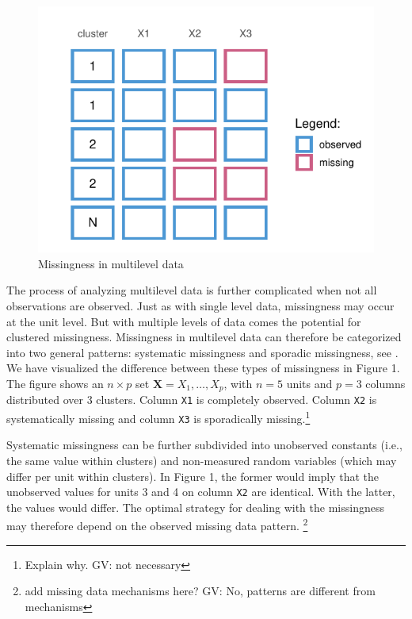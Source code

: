 \documentclass[
]{jss}
\begin{document}
\begin{CodeChunk}
\begin{figure}

{\centering \includegraphics{Manuscript_files/figure-latex/patterns-1} 

}

\caption[Missingness in multilevel data]{Missingness in multilevel data}\label{fig:patterns}
\end{figure}
\end{CodeChunk}

The process of analyzing multilevel data is further complicated when not
all observations are observed. Just as with single level data,
missingness may occur at the unit level. But with multiple levels of
data comes the potential for clustered missingness. Missingness in
multilevel data can therefore be categorized into two general patterns:
systematic missingness and sporadic missingness, see \citet{resc13}. We
have visualized the difference between these types of missingness in
Figure 1. The figure shows an \(n \times p\) set
\(\mathbf{X} = X_1, \dots, X_p\), with \(n=5\) units and \(p=3\) columns
distributed over 3 clusters. Column \texttt{X1} is completely observed.
Column \texttt{X2} is systematically missing and column \texttt{X3} is
sporadically missing.\footnote{Explain why. GV: not necessary}

Systematic missingness can be further subdivided into unobserved
constants (i.e., the same value within clusters) and non-measured random
variables (which may differ per unit within clusters). In Figure 1, the
former would imply that the unobserved values for units 3 and 4 on
column \texttt{X2} are identical. With the latter, the values would
differ. The optimal strategy for dealing with the missingness may
therefore depend on the observed missing data pattern. \footnote{add
  missing data mechanisms here? GV: No, patterns are different from
  mechanisms}
\end{document}
